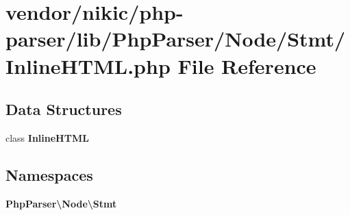 \section{vendor/nikic/php-\/parser/lib/\+Php\+Parser/\+Node/\+Stmt/\+Inline\+H\+T\+M\+L.php File Reference}
\label{_inline_h_t_m_l_8php}
\subsection*{Data Structures}
\begin{DoxyCompactItemize}
\item 
class {\bf Inline\+H\+T\+M\+L}
\end{DoxyCompactItemize}
\subsection*{Namespaces}
\begin{DoxyCompactItemize}
\item 
 {\bf Php\+Parser\textbackslash{}\+Node\textbackslash{}\+Stmt}
\end{DoxyCompactItemize}
